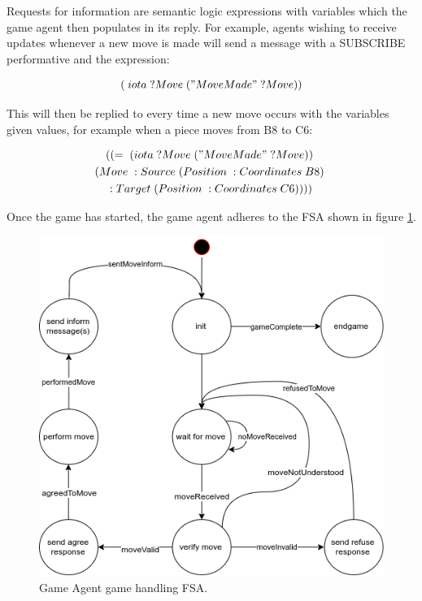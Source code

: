 \documentclass[conference]{IEEEtran}
\begin{document}
Requests for information are semantic logic expressions with variables which the game agent then populates in its reply. For example, agents wishing to receive updates whenever a new move is made will send a message with a SUBSCRIBE performative and the expression:

\begin{equation} \label{eq:movesubscribe}
	(\;iota\; ?Move\; ("Move Made"\; ?Move))	
\end{equation}

This will then be replied to every time a new move occurs with the variables given values, for example when a piece moves from B8 to C6:

\begin{multline} \label{eq:movesubscribe}
	((=\; (iota\; ?Move\; ("Move Made"\; ?Move))\;  \\
	(Move\; :Source\; (Position\; :Coordinates\; B8)\; \\
	:Target\; (Position\; :Coordinates\; C6))))
\end{multline}

Once the game has started, the game agent adheres to the FSA shown in figure \ref{fig:gameagentfsa}. 

\begin{figure}[!h]
	\centering
	\includegraphics[width=\linewidth]{images/gameagentfsa}
	\caption{Game Agent game handling FSA.}
	\label{fig:gameagentfsa}
\end{figure}
\end{document}
